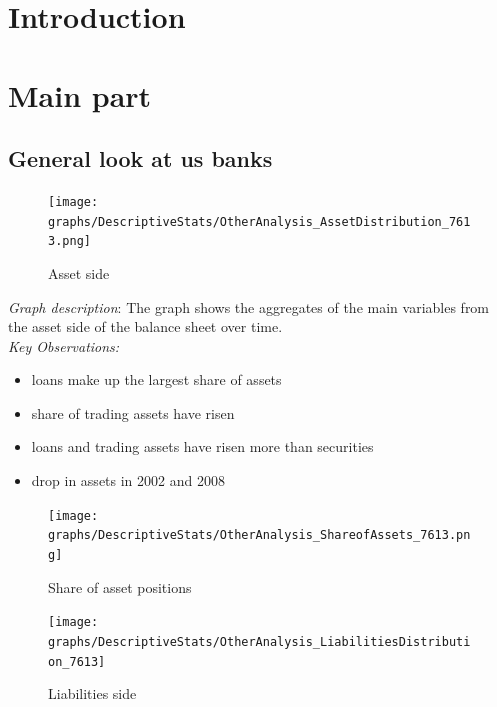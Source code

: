 \documentclass[12pt, a4paper]{article} %
\begin{document}
\tableofcontents
\newpage
{}




\section{Introduction}


\section{Main part}

\subsection{General look at us banks}



\begin{figure}[hbtp]
\centering
\caption{Asset side}
\texttt{[image: graphs/DescriptiveStats/OtherAnalysis\_AssetDistribution\_7613.png]}
\end{figure}


\noindent \textit{Graph description}: The graph shows the aggregates of the main variables from the asset side of the balance sheet over time.\\

\noindent \textit{Key Observations:}
\begin{itemize}
\item loans make up the largest share of assets
\item share of trading assets have risen
\item loans and trading assets have risen more than securities
\item drop in assets in 2002 and 2008
\end{itemize}

\newpage

\begin{figure}[hbtp]
\centering
\caption{Share of asset positions}
\texttt{[image: graphs/DescriptiveStats/OtherAnalysis\_ShareofAssets\_7613.png]}
\end{figure}


\begin{figure}[hbtp]
\centering
\caption{Liabilities side}
\texttt{[image: graphs/DescriptiveStats/OtherAnalysis\_LiabilitiesDistribution\_7613]}
\end{figure}
\end{document}
